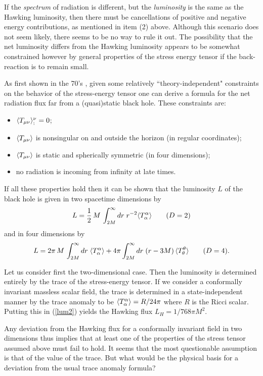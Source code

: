 If the {\it spectrum} of radiation is different, but the {\it luminosity}
is the same as the Hawking luminosity, then there must be cancellations
of positive and negative energy contributions, as mentioned in item
(2) above. Although this scenario does not seem likely, there seems
to be no way to rule it out. The possibility that the net luminosity
differs from the Hawking luminosity appears to be somewhat constrained
however by general properties of the stress energy tensor if the
back-reaction is to remain small.

As first shown in the 70's \cite{DavFullUn,ChristFull},
given some relatively ``theory-independent" constraints on
the behavior of the stress-energy tensor one can derive
a formula for the net radiation flux far from a (quasi)static black hole.
These constraints are:
\begin{itemize}
\item $\langle T_{\mu\nu}\rangle_{;}^{\nu}=0$;
\item $\langle T_{\mu\nu}\rangle$ is nonsingular on and outside
the horizon (in regular coordinates);
\item $\langle T_{\mu\nu}\rangle$ is static and spherically
symmetric (in four dimensions);
\item no radiation is incoming from infinity at late
times.
\end{itemize}
If all these properties hold then it can be shown\cite{ChristFull}
that the luminosity $L$ of the black hole is given in
two spacetime dimensions by
\begin{equation}
L={1\over2}\, M\, \int_{2M}^\infty dr\;
r^{-2} \langle T_\alpha^\alpha\rangle\qquad(D=2)
\label{lum2}
\end{equation}
and in four dimensions by
\begin{equation}
L=2\pi\, M\, \int_{2M}^\infty dr\; \langle T_\alpha^\alpha\rangle
+4\pi\int_{2M}^\infty dr\; (r-3M)\,
\langle T_\theta^\theta\rangle\qquad(D=4).
\label{L}
\end{equation}

Let us consider first the two-dimensional case. Then the
luminosity is determined entirely by the trace of the
stress-energy tensor. If we consider a conformally invariant
massless scalar field, the trace is determined in a
state-independent manner by the trace anomaly to be
$\langle T_\alpha^\alpha\rangle =R/24\pi$ where $R$ is the Ricci
scalar. Putting this in (\ref{lum2}) yields the Hawking
flux $L_H=1/768\pi M^2$.

Any deviation from the Hawking flux
for a conformally invariant field in two dimensions thus implies
that at least one of the properties of the stress tensor assumed
above must fail to hold. It seems that the most questionable assumption
is that of the value of the trace. But what would be the physical
basis for a deviation from the usual trace anomaly formula?

